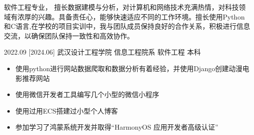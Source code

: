 \documentclass[zh]{resume}
\begin{document}
\makeheader

{\onehalfspacing\hspace{2em}%
软件工程专业，
擅长数据建模与分析，对计算机和网络技术充满热情，对科技领域有浓厚的兴趣。具备责任心，能够快速适应不同的工作环境。擅长使用Python和C语言,在学校的项目实训中，我与团队成员保持良好的合作关系，积极进行信息交流，以确保团队保持一致性和高效协作。
\par}

\begin{competences}

\end{competences}

\begin{educations}
  \education%
    {2022.09}%
    [2024.06]%
    {武汉设计工程学院}%
    {信息工程院系}%
    {软件工程}%
    {本科}
\end{educations}

\begin{itemize}
  \item 使用python进行网站数据爬取和数据分析有着经验，并使用Django创建动漫电影推荐网站
  \item 使用微信开发者工具编写几个小型的微信小程序
  \item 使用过用ECS搭建过小型个人博客
  \item 参加学习了鸿蒙系统开发并取得“HarmonyOS 应用开发者高级认证”
\end{itemize}

\end{document}

